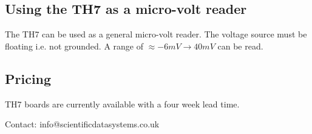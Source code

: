 \documentclass[10pt,foldmark]{leaflet}
\begin{document}
\subsection{Using the TH7 as a micro-volt reader}

The TH7 can be used as a general micro-volt reader.
The voltage source must be floating i.e. not grounded.
A range of $\approx -6mV \rightarrow 40mV$ can be read.
\clearpage
\subsection{Pricing}

TH7 boards are currently available with a four week lead time.
\vspace{3.5cm}
\mbox{}
\vfill
{}

\vspace{0.5cm}
Contact: info@scientificdatasystems.co.uk
\end{document}
